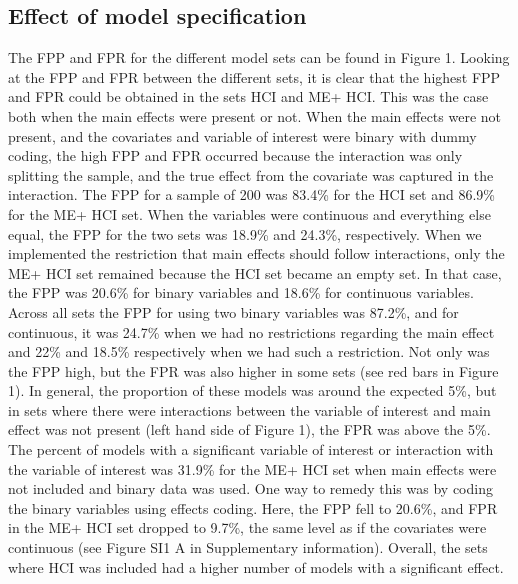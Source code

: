 \subsection{Effect of model specification}
The FPP and FPR for the different model sets can be found in Figure 1. Looking at the FPP and FPR between the different sets, it is clear that the highest FPP and FPR could be obtained in the sets HCI and ME+ HCI. This was the case both when the main effects were present or not. When the main effects were not present, and the covariates and variable of interest were binary with dummy coding, the high FPP and FPR occurred because the interaction was only splitting the sample, and the true effect from the covariate was captured in the interaction. The FPP for a sample of 200 was 83.4\% for the HCI set and 86.9\% for the ME+ HCI set. When the variables were continuous and everything else equal, the FPP for the two sets was 18.9\% and 24.3\%, respectively. When we implemented the restriction that main effects should follow interactions, only the ME+ HCI set remained because the HCI set became an empty set. In that case, the FPP was 20.6\% for binary variables and 18.6\% for continuous variables. Across all sets the FPP for using two binary variables was 87.2\%, and for continuous, it was 24.7\% when we had no restrictions regarding the main effect and 22\% and 18.5\% respectively when we had such a restriction. 
Not only was the FPP high, but the FPR was also higher in some sets (see red bars in Figure 1). In general, the proportion of these models was around the expected 5\%, but in sets where there were interactions between the variable of interest and main effect was not present (left hand side of Figure 1), the FPR was above the 5\%. The percent of models with a significant variable of interest or interaction with the variable of interest was 31.9\% for the ME+ HCI set when main effects were not included and binary data was used. One way to remedy this was by coding the binary variables using effects coding. Here, the FPP fell to 20.6\%, and FPR in the ME+ HCI set dropped to 9.7\%, the same level as if the covariates were continuous (see Figure SI1 A in Supplementary information). Overall, the sets where HCI was included had a higher number of models with a significant effect. 
